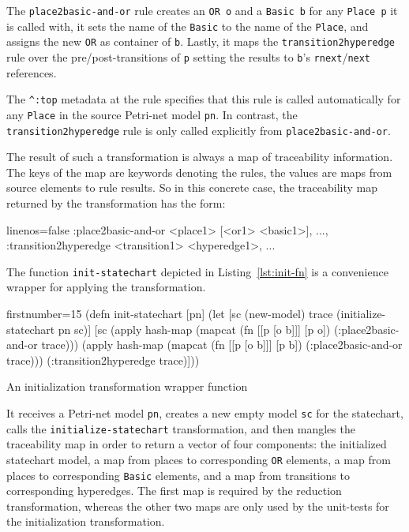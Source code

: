 \documentclass[submission]{eptcs}
\begin{document}
\begin{sloppypar}
  The \verb|place2basic-and-or| rule creates an \verb|OR o| and a
  \verb|Basic b| for any \verb|Place p| it is called with, it sets the name of
  the \verb|Basic| to the name of the \verb|Place|, and assigns the new
  \verb|OR| as container of \verb|b|.  Lastly, it maps the
  \verb|transition2hyperedge| rule over the pre/post-transitions of \verb|p|
  setting the results to \verb|b|'s \verb|rnext|/\verb|next| references.

  The \verb|^:top| metadata at the rule specifies that this rule is called
  automatically for any \verb|Place| in the source Petri-net model \verb|pn|.
  In contrast, the \verb|transition2hyperedge| rule is only called explicitly
  from \verb|place2basic-and-or|.
\end{sloppypar}

The result of such a transformation is always a map of traceability
information.  The keys of the map are keywords denoting the rules, the values
are maps from source elements to rule results.  So in this concrete case, the
traceability map returned by the transformation has the form:

\begin{clojurecode*}{linenos=false}
{:place2basic-and-or   {<place1> [<or1> <basic1>], ...},
 :transition2hyperedge {<transition1> <hyperedge1>, ...}}
\end{clojurecode*}

The function \verb|init-statechart| depicted in Listing~\ref{lst:init-fn} is a
convenience wrapper for applying the transformation.

\begin{listing}[H]
  \begin{clojurecode*}{firstnumber=15}
(defn init-statechart [pn]
  (let [sc (new-model)
        trace (initialize-statechart pn sc)]
    [sc
     (apply hash-map (mapcat (fn [[p [o b]]] [p o])
                             (:place2basic-and-or trace)))
     (apply hash-map (mapcat (fn [[p [o b]]] [p b])
                             (:place2basic-and-or trace)))
     (:transition2hyperedge trace)]))
  \end{clojurecode*}
  \label{lst:init-fn}
  \caption{An initialization transformation wrapper function}
\end{listing}

It receives a Petri-net model \verb|pn|, creates a new empty model \verb|sc|
for the statechart, calls the \verb|initialize-statechart| transformation, and
then mangles the traceability map in order to return a vector of four
components: the initialized statechart model, a map from places to
corresponding \verb|OR| elements, a map from places to corresponding
\verb|Basic| elements, and a map from transitions to corresponding hyperedges.
The first map is required by the reduction transformation, whereas the other
two maps are only used by the unit-tests for the initialization transformation.
\end{document}
